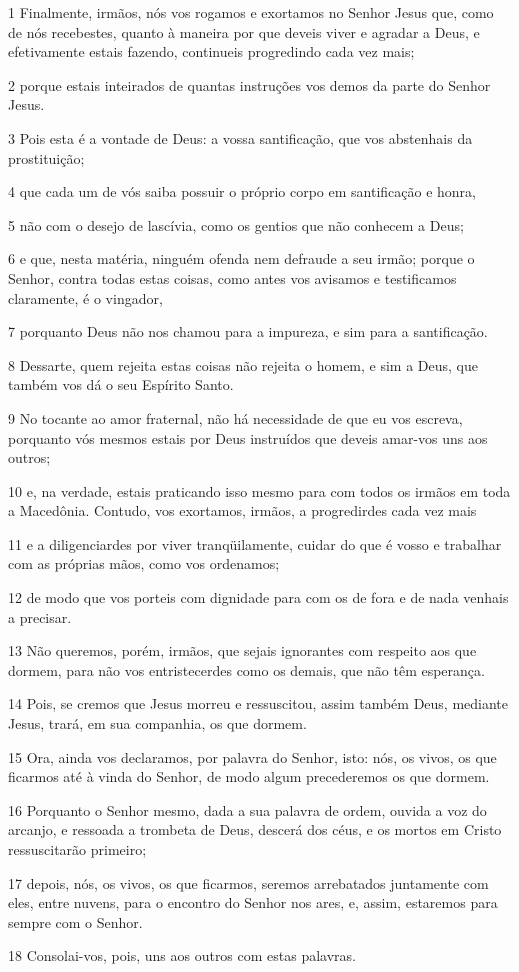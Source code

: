 \par 1 Finalmente, irmãos, nós vos rogamos e exortamos no Senhor Jesus que, como de nós recebestes, quanto à maneira por que deveis viver e agradar a Deus, e efetivamente estais fazendo, continueis progredindo cada vez mais;
\par 2 porque estais inteirados de quantas instruções vos demos da parte do Senhor Jesus.
\par 3 Pois esta é a vontade de Deus: a vossa santificação, que vos abstenhais da prostituição;
\par 4 que cada um de vós saiba possuir o próprio corpo em santificação e honra,
\par 5 não com o desejo de lascívia, como os gentios que não conhecem a Deus;
\par 6 e que, nesta matéria, ninguém ofenda nem defraude a seu irmão; porque o Senhor, contra todas estas coisas, como antes vos avisamos e testificamos claramente, é o vingador,
\par 7 porquanto Deus não nos chamou para a impureza, e sim para a santificação.
\par 8 Dessarte, quem rejeita estas coisas não rejeita o homem, e sim a Deus, que também vos dá o seu Espírito Santo.
\par 9 No tocante ao amor fraternal, não há necessidade de que eu vos escreva, porquanto vós mesmos estais por Deus instruídos que deveis amar-vos uns aos outros;
\par 10 e, na verdade, estais praticando isso mesmo para com todos os irmãos em toda a Macedônia. Contudo, vos exortamos, irmãos, a progredirdes cada vez mais
\par 11 e a diligenciardes por viver tranqüilamente, cuidar do que é vosso e trabalhar com as próprias mãos, como vos ordenamos;
\par 12 de modo que vos porteis com dignidade para com os de fora e de nada venhais a precisar.
\par 13 Não queremos, porém, irmãos, que sejais ignorantes com respeito aos que dormem, para não vos entristecerdes como os demais, que não têm esperança.
\par 14 Pois, se cremos que Jesus morreu e ressuscitou, assim também Deus, mediante Jesus, trará, em sua companhia, os que dormem.
\par 15 Ora, ainda vos declaramos, por palavra do Senhor, isto: nós, os vivos, os que ficarmos até à vinda do Senhor, de modo algum precederemos os que dormem.
\par 16 Porquanto o Senhor mesmo, dada a sua palavra de ordem, ouvida a voz do arcanjo, e ressoada a trombeta de Deus, descerá dos céus, e os mortos em Cristo ressuscitarão primeiro;
\par 17 depois, nós, os vivos, os que ficarmos, seremos arrebatados juntamente com eles, entre nuvens, para o encontro do Senhor nos ares, e, assim, estaremos para sempre com o Senhor.
\par 18 Consolai-vos, pois, uns aos outros com estas palavras.

